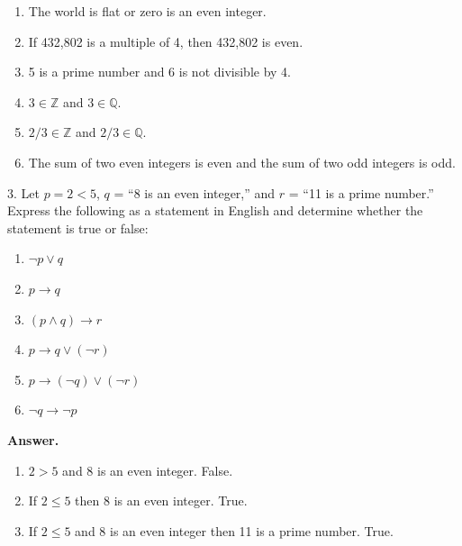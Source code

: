 \documentclass[10pt,]{book}
\theoremstyle{plain}
\theoremstyle{definition}
\theoremstyle{definition}
\theoremstyle{definition}
\theoremstyle{definition}
\begin{document}
\begin{exercisegroup}
\begin{enumerate}[label=\alph*]
\item\hypertarget{li-27}{}The world is flat or zero is an even integer.%
\item\hypertarget{li-28}{}If 432,802 is a multiple of 4, then 432,802 is even.%
\item\hypertarget{li-29}{}5 is a prime number and 6 is not divisible by 4. %
\item\hypertarget{li-30}{}\(3 \in \mathbb{Z}\) and \(3 \in  \mathbb{Q}\).%
\item\hypertarget{li-31}{}\(2/3 \in  \mathbb{Z}\) and \(2/3 \in  \mathbb{Q}\).%
\item\hypertarget{li-32}{}The sum of two even integers is even and the sum of two odd integers is { }odd.%
\end{enumerate}
%
\par\smallskip
\item[3.]\hypertarget{exercise-3}{}Let \(p = 2 < 5\), \(q\) = ``8 is an even integer,'' and \(r\) = ``11 is a prime number.'' Express the following as a statement in English and determine whether the statement is true or false:%
\par
\leavevmode%
\begin{multicols}{2}
\begin{enumerate}[label=\alph*]
\item\hypertarget{li-33}{} \(\neg  p \lor  q\) %
\item\hypertarget{li-34}{} \(p\rightarrow q\)%
\item\hypertarget{li-35}{} \((p \land q)\to r\) %
\item\hypertarget{li-36}{} \(p\to q \lor  (\neg r)\)%
\item\hypertarget{li-37}{} \(p\rightarrow (\neg q)\lor  (\neg r)\)%
\item\hypertarget{li-38}{} \(\neg q\to \neg p\)%
\end{enumerate}
\end{multicols}
%
\par\smallskip
\par\smallskip
\noindent\textbf{Answer.}\hypertarget{answer-2}{}\quad
\leavevmode%
\begin{enumerate}[label=\alph*]
\item\hypertarget{li-39}{} \(2>5\) and 8 is an even integer. False.%
\item\hypertarget{li-40}{} If \(2\leqslant 5\) then 8 is an even integer. True.%
\item\hypertarget{li-41}{} If \(2\leqslant 5\) and 8 is an even integer then 11 is a prime number. True.%

\end{enumerate}
\end{exercisegroup}
\end{document}
